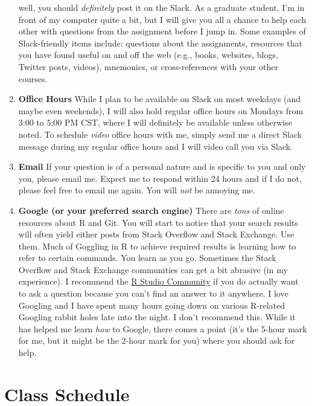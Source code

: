 \documentclass[11pt,]{article}
\begin{document}
\begin{enumerate}
  well, you should \emph{definitely} post it on the Slack. As a graduate
  student, I'm in front of my computer quite a bit, but I will give you
  all a chance to help each other with questions from the assignment
  before I jump in. Some examples of Slack-friendly items include:
  questions about the assignments, resources that you have found useful
  on and off the web (e.g., books, websites, blogs, Twitter posts,
  videos), mnemonics, or cross-references with your other courses.
\item
  \textbf{Office Hours} While I plan to be available on Slack on most
  weekdays (and maybe even weekends), I will also hold regular office
  hours on Mondays from 3:00 to 5:00 PM CST, where I will definitely be
  available unless otherwise noted. To schedule \emph{video} office
  hours with me, simply send me a direct Slack message during my regular
  office hours and I will video call you via Slack.
\item
  \textbf{Email} If your question is of a personal nature and is
  specific to you and only you, please email me. Expect me to respond
  within 24 hours and if I do not, please feel free to email me again.
  You will \emph{not} be annoying me.
\item
  \textbf{Google (or your preferred search engine)} There are
  \emph{tons} of online resources about R and Git. You will start to
  notice that your search results will often yield either posts from
  Stack Overflow and Stack Exchange. Use them. Much of Goggling in R to
  achieve required results is learning how to refer to certain commands.
  You learn as you go. Sometimes the Stack Overflow and Stack Exchange
  communities can get a bit abrasive (in my experience). I recommend the
  \href{https://community.rstudio.com/}{R Studio Community} if you do
  actually want to ask a question because you can't find an answer to it
  anywhere. I love Googling and I have spent many hours going down on
  various R-related Googling rabbit holes late into the night. I don't
  recommend this. While it has helped me learn \emph{how} to Google,
  there comes a point (it's the 5-hour mark for me, but it might be the
  2-hour mark for you) where you should ask for help.
\end{enumerate}

\hypertarget{class-schedule}{%
\section{Class Schedule}\label{class-schedule}}
\end{document}
